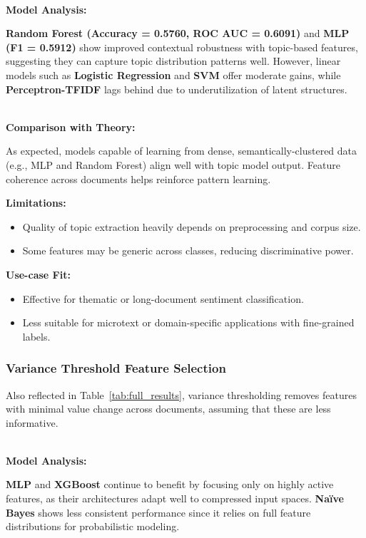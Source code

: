 ${}$\\
\textbf{Model Analysis:} 

\textbf{Random Forest (Accuracy = 0.5760, ROC AUC = 0.6091)} and \textbf{MLP (F1 = 0.5912)} show improved contextual robustness with topic-based features, suggesting they can capture topic distribution patterns well. However, linear models such as \textbf{Logistic Regression} and \textbf{SVM} offer moderate gains, while \textbf{Perceptron-TFIDF} lags behind due to underutilization of latent structures.

${}$\\
\textbf{Comparison with Theory:} 

As expected, models capable of learning from dense, semantically-clustered data (e.g., MLP and Random Forest) align well with topic model output. Feature coherence across documents helps reinforce pattern learning.

\textbf{Limitations:}

\begin{itemize}
    \item Quality of topic extraction heavily depends on preprocessing and corpus size.
    \item Some features may be generic across classes, reducing discriminative power.
\end{itemize}

\textbf{Use-case Fit:}

\begin{itemize}
    \item Effective for thematic or long-document sentiment classification.
    \item Less suitable for microtext or domain-specific applications with fine-grained labels.
\end{itemize}

\subsubsection{Variance Threshold Feature Selection}

Also reflected in Table~\ref{tab:full_results}, variance thresholding removes features with minimal value change across documents, assuming that these are less informative.

${}$\\
\textbf{Model Analysis:} 

\textbf{MLP} and \textbf{XGBoost} continue to benefit by focusing only on highly active features, as their architectures adapt well to compressed input spaces. \textbf{Naïve Bayes} shows less consistent performance since it relies on full feature distributions for probabilistic modeling.

